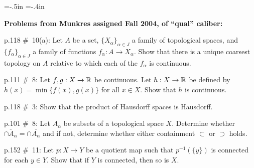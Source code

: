 



 


\loadmsbm



\hsize=6.3in
\vsize=9in
\voffset=-.5in
\hoffset=-.4in



\parindent=-10pt



\def\msk{\vskip2pt}

\def\bsk{\bigskip}

\def\ssk{\smallskip}
\def\ctln{\centerline}



\nopagenumbers

\ctln{\bf Problems from Munkres assigned Fall 2004, of ``qual'' caliber:}

\medskip



p.118 \#\ 10(a): Let $A$ be a set, $\{X_\alpha\}_{\alpha \in J}$
a family of topological spaces, and $\{f_\alpha\}_{\alpha \in J}$
a family of functions $f_\alpha:A \rightarrow X_\alpha$.  Show that
there is a unique coarsest topology on $A$ relative to which
 each of the $f_\alpha$ is continuous.



\msk



p.111 \#\  8: Let $f,g:X \rightarrow {\Bbb R}$ be continuous.
Let $h:X \rightarrow {\Bbb R}$ be defined by $h(x)=\min\{f(x),g(x)\}$
 for all $x \in X$.  Show that $h$ is continuous.



\msk


p.118 \#\ 3:  Show that the product of Hausdorff spaces is Hausdorff.



\msk



p.101 \#\  8: Let $A_\alpha$ be subsets of a topological
space $X$. 
Determine whether $\overline{\cap A_\alpha}=
\cap \overline{A_\alpha}$ and 
if not, determine whether
 either containment $\subset$ or $\supset$ holds.



\msk



p.152 \#\  11: Let $p:X \rightarrow Y$ be a quotient map
 such that $p^{-1}(\{y\})$ is connected for each $y \in Y$. 
Show that if $Y$ is connected, then so is $X$.



